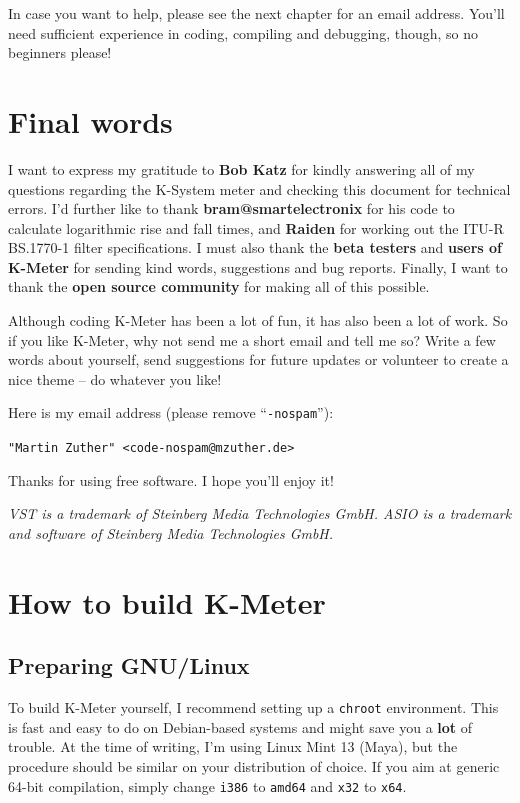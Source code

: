 In case you want to help, please see the next chapter for an email
address.  You’ll need sufficient experience in coding, compiling and
debugging, though, so no beginners please!

\chapter{Final words}
\label{chap:final_words}

I want to express my gratitude to \textbf{Bob Katz} for kindly
answering all of my questions regarding the K-System meter and
checking this document for technical errors.  I'd further like to
thank \textbf{bram@smartelectronix} for his code to calculate
logarithmic rise and fall times, and \textbf{Raiden} for working out
the ITU-R BS.1770-1 filter specifications.  I must also thank the
\textbf{beta testers} and \textbf{users of K-Meter} for sending kind
words, suggestions and bug reports.  Finally, I want to thank the
\textbf{open source community} for making all of this possible.

Although coding K-Meter has been a lot of fun, it has also been a lot
of work.  So if you like K-Meter, why not send me a short email and
tell me so?  Write a few words about yourself, send suggestions for
future updates or volunteer to create a nice theme -- do whatever you
like!

Here is my email address (please remove ``\texttt{-nospam}''):

\begin{center}
  \texttt{"Martin Zuther" <code-nospam@mzuther.de>}
\end{center}

Thanks for using free software.  I hope you'll enjoy it!

\emph{VST is a trademark of Steinberg Media Technologies GmbH.  ASIO
  is a trademark and software of Steinberg Media Technologies GmbH.}

\appendix

\chapter{How to build K-Meter}
\label{chap:build_kmeter}

\section{Preparing GNU/Linux}

To build K-Meter yourself, I recommend setting up a \texttt{chroot}
environment.  This is fast and easy to do on Debian-based systems and
might save you a \textbf{lot} of trouble.  At the time of writing, I'm
using Linux Mint 13 (Maya), but the procedure should be similar on
your distribution of choice.  If you aim at generic \num{64}-bit
compilation, simply change \texttt{i386} to \texttt{amd64} and
\texttt{x32} to \texttt{x64}.

